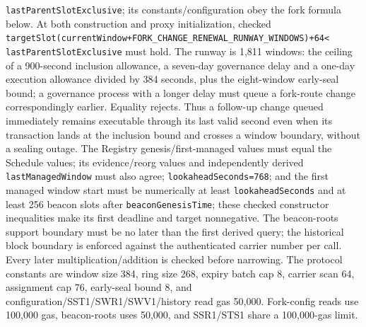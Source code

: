 \documentclass[a4paper,11pt]{article}
\newcommand{\code}[1]{\nolinkurl{#1}}
\begin{document}
\code{lastParentSlotExclusive}; its constants/configuration obey
the fork formula below.  At both construction and proxy initialization, checked
\code{targetSlot(currentWindow+FORK\_CHANGE\_RENEWAL\_RUNWAY\_WINDOWS)+64<
lastParentSlotExclusive} must hold.  The runway is 1,811 windows: the ceiling
of a 900-second inclusion allowance, a seven-day governance delay and a
one-day execution allowance divided by 384 seconds, plus the eight-window
early-seal bound; a governance process with a longer delay must queue a
fork-route change correspondingly earlier.
Equality rejects.  Thus a follow-up change queued immediately remains
executable through its last valid second even when its transaction lands
at the inclusion bound and crosses a window boundary, without a sealing outage.  The Registry
genesis/first-managed values must equal
the Schedule values; its evidence/reorg values and independently derived
\code{lastManagedWindow} must also agree; \code{lookaheadSeconds=768}; and the first managed window
start must be numerically at least \code{lookaheadSeconds} and at least 256
beacon slots after \code{beaconGenesisTime}; these checked constructor
inequalities make its first deadline and target nonnegative.  The beacon-roots
support boundary must be no later than the first derived query; the historical
block boundary is enforced against the authenticated carrier number per call.
Every later multiplication/addition is checked before narrowing.  The protocol
constants are window size 384, ring size
268, expiry batch cap 8, carrier scan 64, assignment cap 76, early-seal bound
8, and configuration/SST1/SWR1/SWV1/history read gas 50,000.  Fork-config
reads use 100,000 gas, beacon-roots uses 50,000, and SSR1/STS1
share a 100,000-gas limit.
\end{document}
